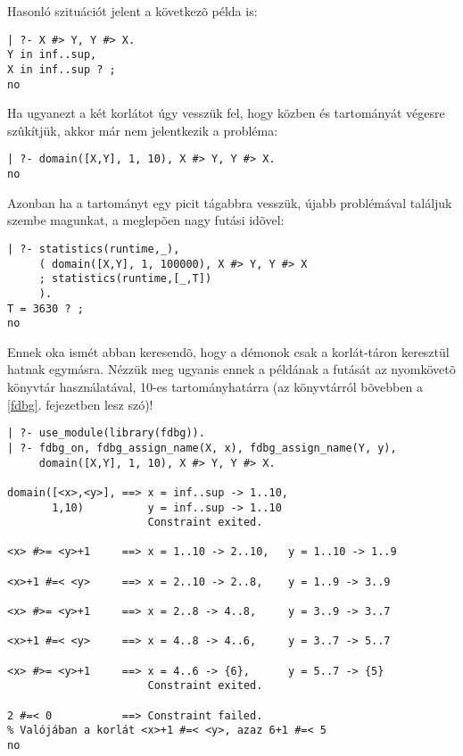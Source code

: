 Hasonló szituációt jelent a következõ példa is:

\begin{verbatim}
| ?- X #> Y, Y #> X.
Y in inf..sup,
X in inf..sup ? ;
no
\end{verbatim}

Ha ugyanezt a két korlátot úgy vesszük fel, hogy közben  és  tartományát
végesre szûkítjük, akkor már nem jelentkezik a probléma:

\begin{verbatim}
| ?- domain([X,Y], 1, 10), X #> Y, Y #> X.
no
\end{verbatim}

Azonban ha a tartományt egy picit tágabbra vesszük, újabb problémával találjuk
szembe magunkat, a meglepõen nagy futási idõvel:

\begin{verbatim}
| ?- statistics(runtime,_),
     ( domain([X,Y], 1, 100000), X #> Y, Y #> X
     ; statistics(runtime,[_,T])
     ).
T = 3630 ? ;
no
\end{verbatim}

Ennek oka ismét abban keresendõ, hogy a démonok csak a korlát-táron keresztül
hatnak egymásra. Nézzük meg ugyanis ennek a példának a futását az \fdbg
nyomkövetõ könyvtár használatával, 10-es tartományhatárra (az \fdbg könyvtárról
bõvebben a \ref{fdbg}. fejezetben lesz szó)!

\begin{verbatim}
| ?- use_module(library(fdbg)).
| ?- fdbg_on, fdbg_assign_name(X, x), fdbg_assign_name(Y, y),
     domain([X,Y], 1, 10), X #> Y, Y #> X.

domain([<x>,<y>], ==> x = inf..sup -> 1..10,     
       1,10)          y = inf..sup -> 1..10
                      Constraint exited.
                  
<x> #>= <y>+1     ==> x = 1..10 -> 2..10,   y = 1..10 -> 1..9
                                            
<x>+1 #=< <y>     ==> x = 2..10 -> 2..8,    y = 1..9 -> 3..9
                                            
<x> #>= <y>+1     ==> x = 2..8 -> 4..8,     y = 3..9 -> 3..7
                                            
<x>+1 #=< <y>     ==> x = 4..8 -> 4..6,     y = 3..7 -> 5..7
                                            
<x> #>= <y>+1     ==> x = 4..6 -> {6},      y = 5..7 -> {5} 
                      Constraint exited.
                  
2 #=< 0           ==> Constraint failed.
% Valójában a korlát <x>+1 #=< <y>, azaz 6+1 #=< 5
no
\end{verbatim}

